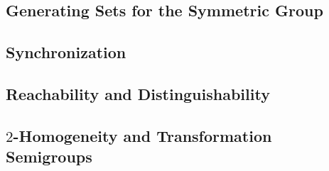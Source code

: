 

\subsection{Generating Sets for the Symmetric Group}
\label{sync_max:grp:Aprim:sym_grp}



\subsection{Synchronization} 
\label{sync_max:grp:Aprim:sync} 



\subsection{Reachability and Distinguishability}
\label{sync_max:grp:Aprim:reach} 



\subsection{\texorpdfstring{$2$}{2}-Homogeneity and Transformation Semigroups} 
\label{sync_max:grp:Aprim:2hom} 


